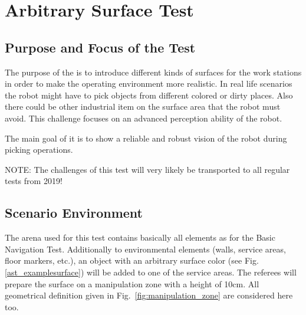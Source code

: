 
\newpage
\section{Arbitrary Surface Test}

\subsection{Purpose and Focus of the Test}
The purpose of the  is to introduce different kinds of surfaces for the work stations in order to make the operating environment more realistic. In real life scenarios the robot might have to pick objects from different colored or dirty places. Also there could be other industrial item on the surface area that the robot must avoid. This challenge focuses on an advanced perception ability of the robot. \par The main goal of it is to show a reliable and robust vision of the robot during picking operations.

\par
NOTE: The challenges of this test will very likely be transported to all regular tests from 2019!

\subsection{Scenario Environment}
The arena used for this test contains basically all elements as for the Basic Navigation Test. Additionally to environmental elements (walls, service areas, floor markers, etc.), an object with an arbitrary surface color (see Fig. \ref{ast_examplesurface}) will be added to one of the service areas. The referees will prepare the surface on a manipulation zone with a height of 10cm. All geometrical definition given in Fig.~\ref{fig:manipulation_zone} are considered here too.

